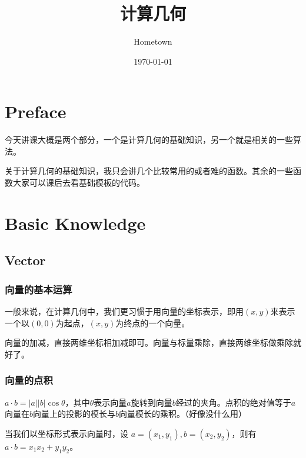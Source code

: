 \documentclass[10pt]{beamer}
\begin{document}
\begin{CJK}{UTF8}{gkai}
	\begin{spacing}{1.2}

		\title[计算几何]{计算几何} %

		\author{Hometown} %
		\date{\today} %

		\begin{frame}
			\titlepage %
		\end{frame}
		\section{Preface}
		\begin{frame}

			今天讲课大概是两个部分，一个是计算几何的基础知识，另一个就是相关的一些算法。 \pause

			关于计算几何的基础知识，我只会讲几个比较常用的或者难的函数。其余的一些函数大家可以课后去看基础模板的代码。

		\end{frame}
		\section{Basic Knowledge}
		\subsection{Vector}
		\begin{frame}
			\frametitle{向量的基本运算}

			一般来说，在计算几何中，我们更习惯于用向量的坐标表示，即用$(x,y)$来表示一个以$(0,0)$为起点，$(x,y)$为终点的一个向量。 \pause

			向量的加减，直接两维坐标相加减即可。向量与标量乘除，直接两维坐标做乘除就好了。

		\end{frame}
		\begin{frame}
			\frametitle{向量的点积}

			$a \cdot b = |a||b| \cos \theta$，其中$\theta$表示向量$a$旋转到向量$b$经过的夹角。点积的绝对值等于$a$向量在$b$向量上的投影的模长与$b$向量模长的乘积。（好像没什么用） \pause

			当我们以坐标形式表示向量时，设 $a = (x_1,y_1),b = (x_2,y_2)$，则有 $a \cdot b = x_1x_2 + y_1y_2$。


\end{frame}
\end{spacing}
\end{CJK}
\end{document}
